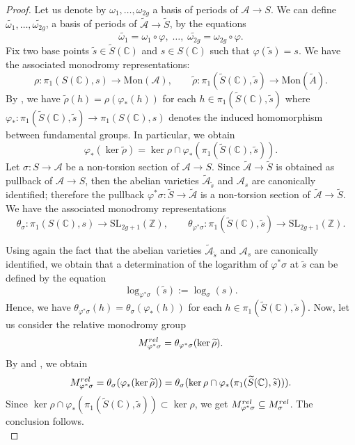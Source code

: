 \documentclass[10pt,a4paper]{amsart}
\newcommand{\bC}{\mathbb C}
\newcommand{\bZ}{\mathbb Z}
\newcommand{\cA}{\mathcal A}
\begin{document}
\begin{proof}
	Let us denote by $\omega_1, \ldots, \omega_{2g}$ a basis of periods of $\cA \rightarrow S$. We can define $\widetilde{\omega_1}, \ldots, \widetilde{\omega_{2g}}$, a basis of periods of $\widetilde{\cA} \rightarrow \widetilde{S}$, by the equations
	\begin{equation}\label{eqn3}
		\widetilde{\omega_1}=\omega_1 \circ \varphi,\; \ldots,\; \widetilde{\omega_{2g}}=\omega_{2g} \circ \varphi.
	\end{equation}
	Fix two base points $\widetilde{s} \in \widetilde{S}(\bC)$ and $s \in S(\bC)$ such that $\varphi(\widetilde{s})=s$. We have the associated monodromy representations:
	\[
    \rho:\pi_1(S(\bC),s) \rightarrow \textrm{Mon}(\cA), \qquad \widetilde{\rho}:\pi_1(\widetilde{S}(\bC),\widetilde{s}) \rightarrow \textrm{Mon}(\widetilde{A}).
    \]
	By , we have $\widetilde{\rho}(h)=\rho(\varphi_*(h))$ for each $h \in \pi_1(\widetilde{S}(\bC),\widetilde{s})$ where $\varphi_*:\pi_1(\widetilde{S}(\bC),\widetilde{s})\rightarrow \pi_1(S(\bC),s)$ denotes the induced homomorphism between fundamental groups. In particular, we obtain
	\begin{equation}\label{eqn3_bis}
		\varphi_*(\ker{\widetilde{\rho}})=\ker{\rho} \cap \varphi_*(\pi_1(\widetilde{S}(\bC),\widetilde{s})).
	\end{equation}
	Let $\sigma:S \rightarrow \cA$ be a non-torsion section of $\cA \rightarrow S$. Since $\widetilde{\cA}\rightarrow \widetilde{S}$ is obtained as pullback of $\cA \rightarrow S$, then the abelian varieties $\widetilde{\cA}_{\widetilde{s}}$ and $\cA_s$ are canonically identified; therefore the pullback $\varphi^*\sigma:\widetilde{S} \rightarrow \widetilde{\cA}$ is a non-torsion section of $\widetilde{\cA} \rightarrow \widetilde{S}$. We have the associated monodromy representations
	\[
    \theta_\sigma:\pi_1(S(\bC),s) \rightarrow \textrm{SL}_{2g+1}(\bZ), \qquad \theta_{\varphi^*\sigma}:\pi_1(\widetilde{S}(\bC),\widetilde{s}) \rightarrow \textrm{SL}_{2g+1}(\bZ).
    \]
		
	Using again the fact that the abelian varieties $\widetilde{\cA}_{\widetilde{s}}$ and $\cA_s$ are canonically identified, we obtain that a determination of the logarithm of $\varphi^*\sigma$ at $\widetilde{s}$ can be defined by the equation
	\begin{equation}\label{eqn4}
		\log_{\varphi^*\sigma}(\widetilde{s}):=\log_\sigma(s).
	\end{equation}
	Hence, we have $\theta_{\varphi^*\sigma}(h)=\theta_\sigma(\varphi_*(h))$ for each $h \in \pi_1(\widetilde{S}(\bC),\widetilde{s})$. Now, let us consider the relative monodromy group
	\[
	M_{\varphi^*\sigma}^{\textnormal{rel}}=\theta_{\varphi^*\sigma}(\ker{\widetilde{\rho}}).
    \]
    By  and , we obtain
	\[
	M_{\varphi^*\sigma}^{\textnormal{rel}} = \theta_\sigma(\varphi_*(\ker{\widetilde{\rho}})) = \theta_{\sigma}(\ker{\rho} \cap \varphi_*(\pi_1(\widetilde{S}(\bC),\widetilde{s}))).
    \]
    Since $\ker{\rho} \cap \varphi_*(\pi_1(\widetilde{S}(\bC),\widetilde{s})) \subset \ker{\rho}$, we get $M_{\varphi^*\sigma}^{\textnormal{rel}} \subseteq M_{\sigma}^{\textnormal{rel}}$. The conclusion follows.\\
\end{proof}
\end{document}
